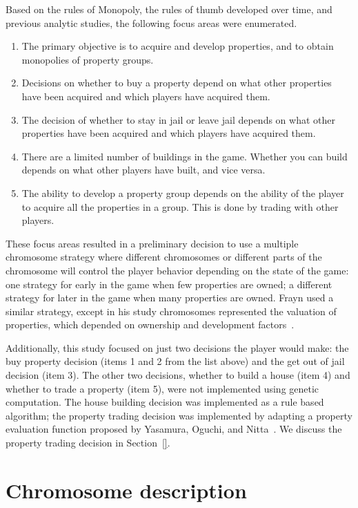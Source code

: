 Based on the rules of Monopoly, the rules of thumb developed over time, and
previous analytic studies, the following focus areas were enumerated.

\begin{enumerate}
  \item{The primary objective is to acquire and develop properties, and to
  obtain monopolies of property groups.}
  \item{Decisions on whether to buy a property depend on what other properties
  have been acquired and which players have acquired them.}  
  \item{The decision of whether to stay in jail or leave jail depends on what
  other properties have been acquired and which players have acquired them.}
  \item{There are a limited number of buildings in the game. Whether you can
  build depends on what other players have built, and vice versa.}
  \item{The ability to develop a property group depends on the ability of the
  player to acquire all the properties in a group. This is done by trading with
  other players.}
\end{enumerate}

These focus areas resulted in a preliminary decision to use a multiple
chromosome strategy where different chromosomes or different parts of the
chromosome will control the player behavior depending on the state of the game:
one strategy for early in the game when few properties are owned; a different
strategy for later in the game when many properties are owned. Frayn used a
similar strategy, except in his study chromosomes represented the valuation of 
properties, which depended on ownership and development
factors~\cite{DBLP:conf/cig/Frayn05}.

Additionally, this study focused on just two decisions the player would make:
the buy property decision (items 1 and 2 from the list above) and the get out of
jail decision (item 3). The other two decisions, whether to build a house (item
4) and whether to trade a property (item 5), were not implemented using genetic
computation. The house building decision was implemented as a rule based
algorithm; the property trading decision was implemented by adapting a property
evaluation function proposed by Yasamura, Oguchi, and
Nitta~\cite{Yasumura2001Negotiate}. We discuss the property trading decision in
Section~\ref{}.

\section{Chromosome description} \label{5_chromo}


